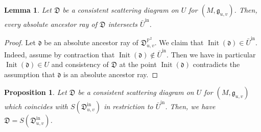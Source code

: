 \documentclass[12pt, a4paper]{amsart}
\newtheorem{lem}[defn]{Lemma}
\newtheorem{prop}[defn]{Proposition}
\newcommand\PP{\mathbb P}
\newcommand\fd{\mathfrak d}
\newcommand\fD{\mathfrak D}
\newcommand\fg{\mathfrak g}
\newcommand\Init{\operatorname{Init}}
\newcommand\iin{\mathrm{in}}
\begin{document}
\begin{lem} \label{lem_absolute_ancestor}
Let $\fD$ be a consistent scattering diagram on $U$ for $(M,\fg_{u,v})$. Then, every absolute ancestor ray of $\fD$ intersects $\bar{U}^\iin$.
\end{lem}

\begin{proof}
Let $\fd$ be an absolute ancestor ray of 
$\fD^{\PP^2}_{u,v}$. We claim that $\Init(\fd) \in \bar{U}^\iin$.
Indeed, assume by contraction that $\Init(\fd) \notin \bar{U}^\iin$.
Then we have in particular $\Init(\fd) \in U$ and consistency 
of $\fD$ at the point 
$\Init(\fd)$ contradicts the assumption that $\fd$ is an absolute ancestor ray.
\end{proof}


\begin{prop} \label{prop_criterion}
Let $\fD$ be a consistent scattering diagram on $U$ for
$(M,\fg_{u,v})$ which coincides with $S(\fD_{u,v}^\iin)$
in restriction to $\bar{U}^\iin$.
Then, we have
$\fD=S(\fD_{u,v}^\iin)$.
\end{prop}
\end{document}
